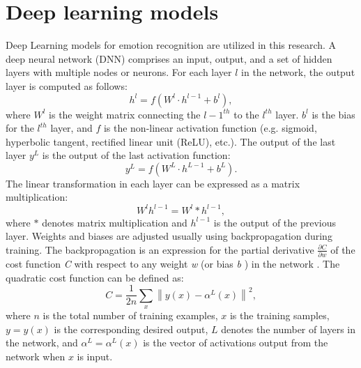 \section{Deep learning models}
\label{sec:dl_models}
Deep Learning models for emotion recognition are utilized in this research. A deep neural network (DNN) comprises an input, output, and a set of hidden layers with multiple nodes or neurons. For each layer $l$ in the network, the output layer is computed as follows:
%
\begin{equation*}
    h^{l} = f(W^{l} \cdot h^{l-1} + b^{l}),\tag{1}
\end{equation*}
%
where $W^{l}$ is the weight matrix connecting the $l-1^{th}$ to the $l^{th}$ layer. $b^{l}$ is the bias for the $l^{th}$ layer, and $f$ is the non-linear activation function (e.g. sigmoid, hyperbolic tangent, rectified linear unit (ReLU), etc.). The output of the last layer $y^{L}$ is the output of the last activation function:
%
\begin{equation*}
    y^{L} = f(W^{L} \cdot h^{L-1} + b^{L}). \tag{2}
\end{equation*}
%
The linear transformation in each layer can be expressed as a matrix multiplication:
%
\begin{equation*}
    W^lh^{l-1} = W^l {*} h^{l-1},\tag{3}
\end{equation*}
%
where $*$ denotes matrix multiplication and $h^{l-1}$ is the output of the previous layer. Weights and biases are adjusted usually using backpropagation during training. The backpropagation is an expression for the partial derivative $\frac{\partial C}{\partial w}$ of the cost function \textit{C} with respect to any weight \textit{w} (or bias \textit{b} ) in the network \cite{cross_cultural}. The quadratic cost function can be defined as:
%
    \begin{equation*} C = \frac {1}{2n}\sum _{x}^{} \left \|{ y(x) - \alpha ^{L}(x) }\right \|^{2},\tag{4}\end{equation*}
%
where $n$ is the total number of training examples, $x$ is the training samples, $y=y(x)$ is the corresponding desired output, $L$ denotes the number of layers in the network, and $\alpha ^{L} = \alpha ^{L}(x)$ is the vector of activations output from the network when $x$ is input.

